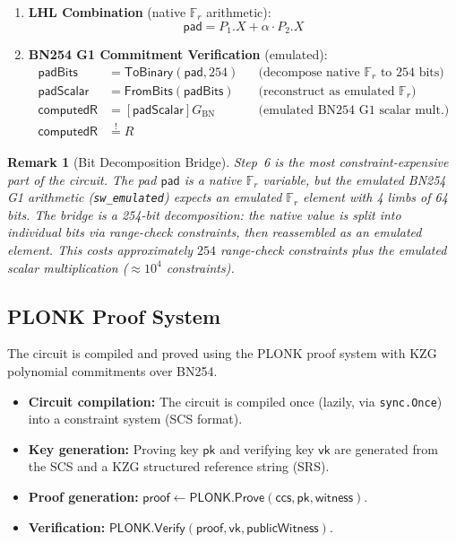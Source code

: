 \documentclass[11pt,a4paper]{article}
\newtheorem{remark}{Remark}[section]
\newcommand{\F}{\mathbb{F}}
\newcommand{\Fr}{\F_r}
\newcommand{\genbn}{G_{\mathrm{BN}}}
\newcommand{\pad}{\mathsf{pad}}
\newcommand{\Verify}{\mathsf{Verify}}
\newcommand{\Prove}{\mathsf{Prove}}
\newcommand{\PLONK}{\mathsf{PLONK}}
\begin{document}
\begin{enumerate}
  \item \textbf{LHL Combination} (native $\Fr$ arithmetic):
  \begin{equation}
    \pad = P_1.X + \alpha \cdot P_2.X
  \end{equation}

  \item \textbf{BN254 G1 Commitment Verification} (emulated):
  \begin{align}
    \mathsf{padBits} &= \mathsf{ToBinary}(\pad, 254)
      &&\text{(decompose native $\Fr$ to 254 bits)} \\
    \mathsf{padScalar} &= \mathsf{FromBits}(\mathsf{padBits})
      &&\text{(reconstruct as emulated $\Fr$)} \\
    \mathsf{computedR} &= [\mathsf{padScalar}]\genbn
      &&\text{(emulated BN254 G1 scalar mult.)} \\
    \mathsf{computedR} &\stackrel{!}{=} R
  \end{align}
\end{enumerate}

\begin{remark}[Bit Decomposition Bridge]
  Step~6 is the most constraint-expensive part of the circuit. The pad $\pad$
  is a native $\Fr$ variable, but the emulated BN254 G1 arithmetic
  (\texttt{sw\_emulated}) expects an emulated $\Fr$ element with 4 limbs of 64
  bits. The bridge is a 254-bit decomposition: the native value is split into
  individual bits via range-check constraints, then reassembled as an emulated
  element. This costs approximately $254$ range-check constraints plus the
  emulated scalar multiplication ($\approx 10^4$ constraints).
\end{remark}

\subsection{PLONK Proof System}
\label{sec:plonk}

The circuit is compiled and proved using the PLONK proof system with KZG
polynomial commitments over BN254.

\begin{itemize}[nosep]
  \item \textbf{Circuit compilation:} The circuit is compiled once (lazily,
    via \texttt{sync.Once}) into a constraint system (SCS format).
  \item \textbf{Key generation:} Proving key $\mathsf{pk}$ and verifying key
    $\mathsf{vk}$ are generated from the SCS and a KZG structured reference
    string (SRS).
  \item \textbf{Proof generation:}
    $\mathsf{proof} \leftarrow \PLONK.\Prove(\mathsf{ccs}, \mathsf{pk}, \mathsf{witness})$.
  \item \textbf{Verification:}
    $\PLONK.\Verify(\mathsf{proof}, \mathsf{vk}, \mathsf{publicWitness})$.
\end{itemize}
\end{document}
